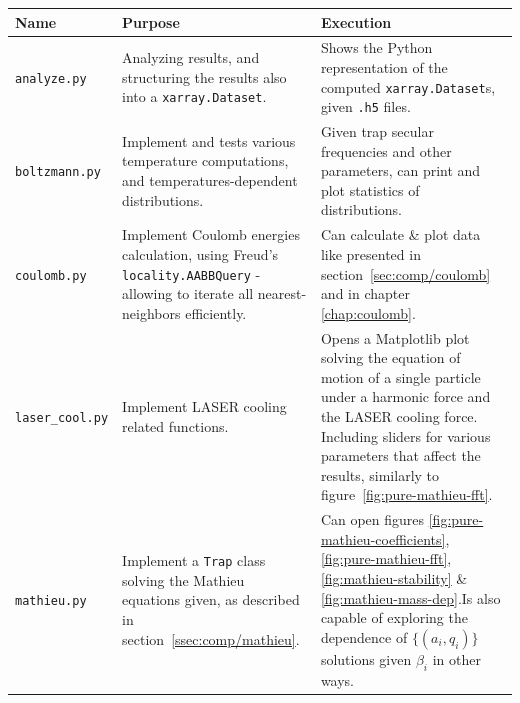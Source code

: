 \begin{table}
\begin{tabularx}{\textwidth}{l|X|X}
Name                            & Purpose                                                                                                                                               & Execution                                                                                                                                                                                                                        \\
\hline
\texttt{analyze.py}             & Analyzing results, and structuring the results also into a \texttt{xarray.Dataset}.                                                                   & Shows the Python representation of the computed \texttt{xarray.Dataset}s, given \texttt{.h5} files.                                                                                                                                                  \\
\hline
\texttt{boltzmann.py}           & Implement and tests various temperature computations, and temperatures-dependent distributions.                                                       & Given trap secular frequencies and other parameters, can print and plot statistics of distributions.                                                                                                                                                 \\
\hline
\texttt{coulomb.py}             & Implement Coulomb energies calculation, using Freud's\cite{freud} \texttt{locality.AABBQuery} - allowing to iterate all nearest-neighbors efficiently. & Can calculate \& plot data like presented in section~\ref{sec:comp/coulomb} and in chapter \ref{chap:coulomb}.                                                                                                                                       \\
\hline
\texttt{laser\_cool.py}         & Implement LASER cooling related functions.                                                                                                             & Opens a Matplotlib plot solving the equation of motion of a single particle under a harmonic force and the LASER cooling force. Including sliders for various parameters that affect the results, similarly to figure~\ref{fig:pure-mathieu-fft}.    \\
\hline
\texttt{mathieu.py}             & Implement a \texttt{Trap} class solving the Mathieu equations given, as described in section~\ref{ssec:comp/mathieu}.                               & Can open figures \ref{fig:pure-mathieu-coefficients}, \ref{fig:pure-mathieu-fft}, \ref{fig:mathieu-stability} \& \ref{fig:mathieu-mass-dep}.Is also capable of exploring the dependence of $\{(a_i, q_i)\}$ solutions given $\beta_i$ in other ways. \\

\end{tabularx}
\end{table}
